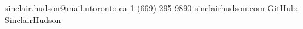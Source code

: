 \documentclass[10pt,a4paper]{article} %
\begin{document}
 



\noindent\href{mailto:sinclair.hudson@mail.utoronto.ca}{sinclair.hudson@mail.utoronto.ca}\bull %
\textsmaller{+}1 (669) 295 9890 \bull %
\href{http://www.sinclairhudson.com}{sinclairhudson.com} \bull
\href{https://github.com/SinclairHudson}{GitHub: SinclairHudson}

\spacedhrule{0.4em}{-0.4em} %



\spacedhrule{1.4em}{-0.4em} %



\spacedhrule{1.4em}{-0.4em} %



\spacedhrule{0.6em}{-0.4em} %


\end{document}
